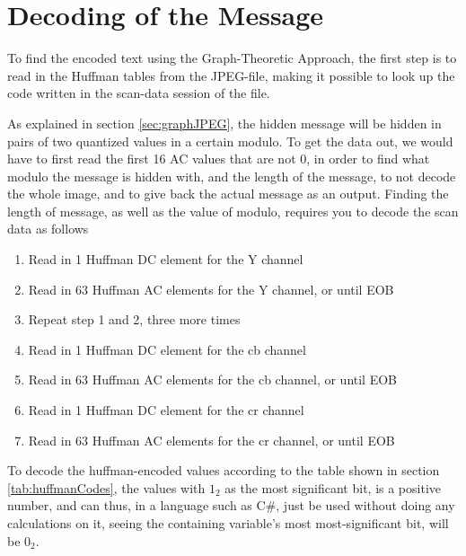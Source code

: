 \section{Decoding of the Message}
To find the encoded text using the Graph-Theoretic Approach, the first step is to read in the Huffman tables from the JPEG-file, making it possible to look up the code written in the scan-data session of the file. 

As explained in section \ref{sec:graphJPEG}, the hidden message will be hidden in pairs of two quantized values in a certain modulo.
To get the data out, we would have to first read the first 16 AC values that are not 0, in order to find what modulo the message is hidden with, and the length of the message, to not decode the whole image, and to give back the actual message as an output.
Finding the length of message, as well as the value of modulo, requires you to decode the scan data as follows
\begin{enumerate}
	\item Read in 1 Huffman DC element for the Y channel
	\item Read in 63 Huffman AC elements for the Y channel, or until EOB
	\item Repeat step 1 and 2, three more times
	\item Read in 1 Huffman DC element for the cb channel
	\item Read in 63 Huffman AC elements for the cb channel, or until EOB
	\item Read in 1 Huffman DC element for the cr channel
	\item Read in 63 Huffman AC elements for the cr channel, or until EOB
\end{enumerate}
To decode the huffman-encoded values according to the table shown in section \ref{tab:huffmanCodes}, the values with $1_2$ as the most significant bit, is a positive number, and can thus, in a language such as C\#, just be used without doing any calculations on it, seeing the containing variable's most most-significant bit, will be $0_2$.

